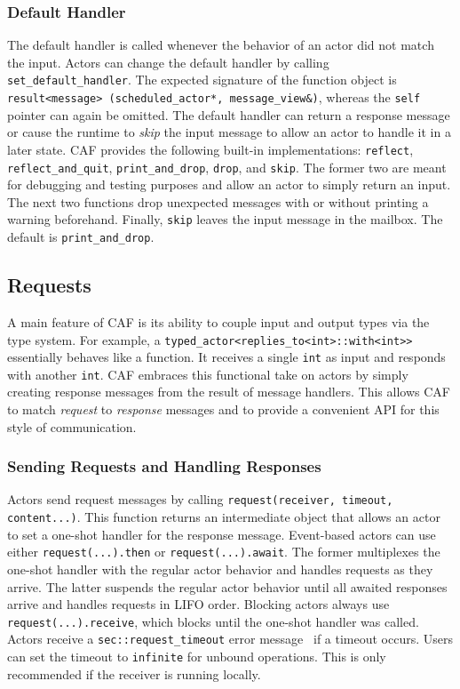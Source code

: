 \subsubsection{Default Handler}
\label{default-handler}

The default handler is called whenever the behavior of an actor did not match
the input. Actors can change the default handler by calling
\lstinline^set_default_handler^. The expected signature of the function object
is \lstinline^result<message> (scheduled_actor*, message_view&)^, whereas the
\lstinline^self^ pointer can again be omitted. The default handler can return a
response message or cause the runtime to \emph{skip} the input message to allow
an actor to handle it in a later state. CAF provides the following built-in
implementations: \lstinline^reflect^, \lstinline^reflect_and_quit^,
\lstinline^print_and_drop^, \lstinline^drop^, and \lstinline^skip^. The former
two are meant for debugging and testing purposes and allow an actor to simply
return an input. The next two functions drop unexpected messages with or
without printing a warning beforehand. Finally, \lstinline^skip^ leaves the
input message in the mailbox. The default is \lstinline^print_and_drop^.

\subsection{Requests}
\label{request}

A main feature of CAF is its ability to couple input and output types via the
type system. For example, a \lstinline^typed_actor<replies_to<int>::with<int>>^
essentially behaves like a function. It receives a single \lstinline^int^ as
input and responds with another \lstinline^int^. CAF embraces this functional
take on actors by simply creating response messages from the result of message
handlers. This allows CAF to match \emph{request} to \emph{response} messages
and to provide a convenient API for this style of communication.

\subsubsection{Sending Requests and Handling Responses}
\label{handling-response}

Actors send request messages by calling \lstinline^request(receiver, timeout, content...)^. This function returns an intermediate object that allows an actor to set a one-shot handler for the response message. Event-based actors can use either \lstinline^request(...).then^ or \lstinline^request(...).await^. The former multiplexes the one-shot handler with the regular actor behavior and handles requests as they arrive. The latter suspends the regular actor behavior until all awaited responses arrive and handles requests in LIFO order. Blocking actors always use \lstinline^request(...).receive^, which blocks until the one-shot handler was called. Actors receive a \lstinline^sec::request_timeout^  error message~ if a timeout occurs. Users can set the timeout to \lstinline^infinite^ for unbound operations. This is only recommended if the receiver is running locally.


